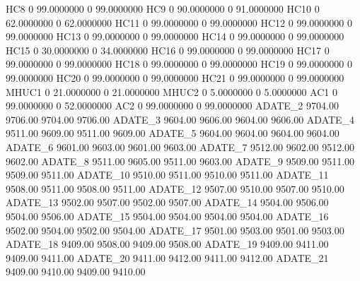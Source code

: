 \documentclass[
  11pt,
  a4paper,
  DIV=12,captions=tableheading,oneside,titlepage]{scrbook}
\let\oldverbatim\verbatim
\let\endoldverbatim\endverbatim
\renewenvironment{verbatim}{\footnotesize\oldverbatim}{\endoldverbatim}
\begin{document}
\begin{verbatim}
  HC8                    0    99.0000000             0    99.0000000 
  HC9                    0    90.0000000             0    91.0000000 
  HC10                   0    62.0000000             0    62.0000000 
  HC11                   0    99.0000000             0    99.0000000 
  HC12                   0    99.0000000             0    99.0000000 
  HC13                   0    99.0000000             0    99.0000000 
  HC14                   0    99.0000000             0    99.0000000 
  HC15                   0    30.0000000             0    34.0000000 
  HC16                   0    99.0000000             0    99.0000000 
  HC17                   0    99.0000000             0    99.0000000 
  HC18                   0    99.0000000             0    99.0000000 
  HC19                   0    99.0000000             0    99.0000000 
  HC20                   0    99.0000000             0    99.0000000 
  HC21                   0    99.0000000             0    99.0000000 
  MHUC1                  0    21.0000000             0    21.0000000 
  MHUC2                  0     5.0000000             0     5.0000000 
  AC1                    0    99.0000000             0    52.0000000 
  AC2                    0    99.0000000             0    99.0000000 
  ADATE_2          9704.00       9706.00       9704.00       9706.00 
  ADATE_3          9604.00       9606.00       9604.00       9606.00 
  ADATE_4          9511.00       9609.00       9511.00       9609.00 
  ADATE_5          9604.00       9604.00       9604.00       9604.00 
  ADATE_6          9601.00       9603.00       9601.00       9603.00 
  ADATE_7          9512.00       9602.00       9512.00       9602.00 
  ADATE_8          9511.00       9605.00       9511.00       9603.00 
  ADATE_9          9509.00       9511.00       9509.00       9511.00 
  ADATE_10         9510.00       9511.00       9510.00       9511.00 
  ADATE_11         9508.00       9511.00       9508.00       9511.00 
  ADATE_12         9507.00       9510.00       9507.00       9510.00 
  ADATE_13         9502.00       9507.00       9502.00       9507.00 
  ADATE_14         9504.00       9506.00       9504.00       9506.00 
  ADATE_15         9504.00       9504.00       9504.00       9504.00 
  ADATE_16         9502.00       9504.00       9502.00       9504.00 
  ADATE_17         9501.00       9503.00       9501.00       9503.00 
  ADATE_18         9409.00       9508.00       9409.00       9508.00 
  ADATE_19         9409.00       9411.00       9409.00       9411.00 
  ADATE_20         9411.00       9412.00       9411.00       9412.00 
  ADATE_21         9409.00       9410.00       9409.00       9410.00 

\end{verbatim}
\end{document}
